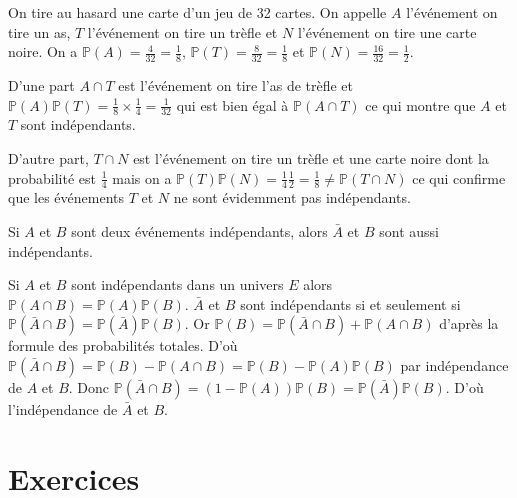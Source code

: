 \documentclass[french]{book}
\begin{document}
\begin{exemple}
On tire au hasard une carte d'un jeu de 32 cartes. On appelle $A$ l'événement \og{}on tire un as\fg{}, $T$ l'événement \og{}on tire un  trèfle\fg{} et $N$ l'événement \og{}on tire une carte noire\fg{}. On a $\mathbb{P}(A)=\frac{4}{32}=\frac{1}{8}$, $\mathbb{P}(T)=\frac{8}{32}=\frac{1}{8}$ et $\mathbb{P}(N)=\frac{16}{32}=\frac{1}{2}$.

 D'une part $A\cap T$ est l'événement \og{}on tire l'as de trèfle\fg{} et $\mathbb{P}(A)\mathbb{P}(T)=\frac{1}{8}\times \frac{1}{4}=\frac{1}{32}$ qui est bien égal à $\mathbb{P}(A\cap T)$ ce qui montre que $A$ et $T$ sont indépendants. 
 
 D'autre part, $T\cap N$ est l'événement \og{}on tire un trèfle et une carte noire\fg{} dont la probabilité est $\frac{1}{4}$ mais on a $\mathbb{P}(T)\mathbb{P}(N)=\frac{1}{4}\frac{1}{2}=\frac{1}{8}\neq \mathbb{P}(T\cap N)$ ce qui confirme que les événements $T$ et $N$ ne sont évidemment pas indépendants.
 
\end{exemple}



\begin{prop}
Si $A$ et $B$ sont deux événements indépendants, alors $\bar{A}$ et $B$ sont aussi indépendants.
\end{prop}

\begin{demo}[Preuve]
Si $A$ et $B$ sont indépendants dans un univers $E$ alors $\mathbb{P}(A\cap B)=\mathbb{P}(A)\mathbb{P}(B)$. $\bar{A}$ et $B$ sont indépendants si et seulement si $\mathbb{P}(\bar{A}\cap B)=\mathbb{P}(\bar{A})\mathbb{P}(B)$. Or $\mathbb{P}(B)=\mathbb{P}(\bar{A}\cap B)+\mathbb{P}(A\cap B)$ d'après la formule des probabilités totales. D'où $\mathbb{P}(\bar{A}\cap B)=\mathbb{P}(B)-\mathbb{P}(A\cap B)=\mathbb{P}(B)-\mathbb{P}(A)\mathbb{P}(B)$ par indépendance de $A$ et $B$. Donc $\mathbb{P}(\bar{A}\cap B)=(1-\mathbb{P}(A))\mathbb{P}(B)=\mathbb{P}(\bar{A})\mathbb{P}(B)$. D'où l'indépendance de $\bar{A}$ et $B$.
\end{demo}

\vfill

\newpage
\section{Exercices}
\end{document}
